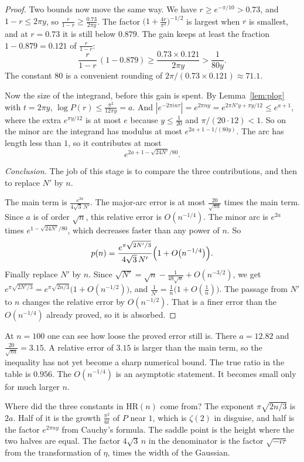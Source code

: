 \begin{proof}
Two bounds now move the same way. We have $r\ge e^{-\pi/10}>0.73$, and $1-r\le2\pi y$, so $\frac r{1-r}\ge\frac{0.73}{2\pi y}$. The factor $\bigl(1+\frac{4r}{\pi^2}\bigr)^{-1/2}$ is largest when $r$ is smallest, and at $r=0.73$ it is still below $0.879$. The gain keeps at least the fraction $1-0.879=0.121$ of $\frac r{1-r}$:
\[
\frac r{1-r}\,(1-0.879)\ge\frac{0.73\times0.121}{2\pi y}>\frac1{80y}.
\]
The constant $80$ is a convenient rounding of $2\pi/(0.73\times0.121)\approx71.1$.

Now the size of the integrand, before this gain is spent. By Lemma~\ref{lem:plog} with $t=2\pi y$, $\log P(r)\le\frac{\pi^2}{12\pi y}=a$. And $|e^{-2\pi in\tau}|=e^{2\pi ny}=e^{2\pi N'y+\pi y/12}\le e^{a+1}$, where the extra $e^{\pi y/12}$ is at most $e$ because $y\le\frac1{20}$ and $\pi/(20\cdot12)<1$. So on the minor arc the integrand has modulus at most $e^{2a+1-1/(80y)}$. The arc has length less than $1$, so it contributes at most
\[
e^{2a+1-\sqrt{24N'}/80}.
\]

\emph{Conclusion.} The job of this stage is to compare the three contributions, and then to replace $N'$ by $n$.

The main term is $\frac{e^{2a}}{4\sqrt3\,N'}$. The major-arc error is at most $\frac{20}{\sqrt{\pi a}}$ times the main term. Since $a$ is of order $\sqrt n$, this relative error is $O(n^{-1/4})$. The minor arc is $e^{2a}$ times $e^{1-\sqrt{24N'}/80}$, which decreases faster than any power of $n$. So
\[
p(n)=\frac{e^{\pi\sqrt{2N'/3}}}{4\sqrt3\,N'}\Bigl(1+O\bigl(n^{-1/4}\bigr)\Bigr).
\]
Finally replace $N'$ by $n$. Since $\sqrt{N'}=\sqrt n-\frac1{48\sqrt n}+O(n^{-3/2})$, we get $e^{\pi\sqrt{2N'/3}}=e^{\pi\sqrt{2n/3}}\bigl(1+O(n^{-1/2})\bigr)$, and $\frac1{N'}=\frac1n\bigl(1+O(\frac1n)\bigr)$. The passage from $N'$ to $n$ changes the relative error by $O(n^{-1/2})$. That is a finer error than the $O(n^{-1/4})$ already proved, so it is absorbed.
\end{proof}

At $n=100$ one can see how loose the proved error still is. There $a=12.82$ and $\frac{20}{\sqrt{\pi a}}=3.15$. A relative error of $3.15$ is larger than the main term, so the inequality has not yet become a sharp numerical bound. The true ratio in the table is $0.956$. The $O(n^{-1/4})$ is an asymptotic statement. It becomes small only for much larger $n$.

Where did the three constants in $\mathrm{HR}(n)$ come from? The exponent $\pi\sqrt{2n/3}$ is $2a$. Half of it is the growth $\frac{\pi^2}{6t}$ of $P$ near $1$, which is $\zeta(2)$ in disguise, and half is the factor $e^{2\pi ny}$ from Cauchy's formula. The saddle point is the height where the two halves are equal. The factor $4\sqrt3\,n$ in the denominator is the factor $\sqrt{-i\tau}$ from the transformation of $\eta$, times the width of the Gaussian.

